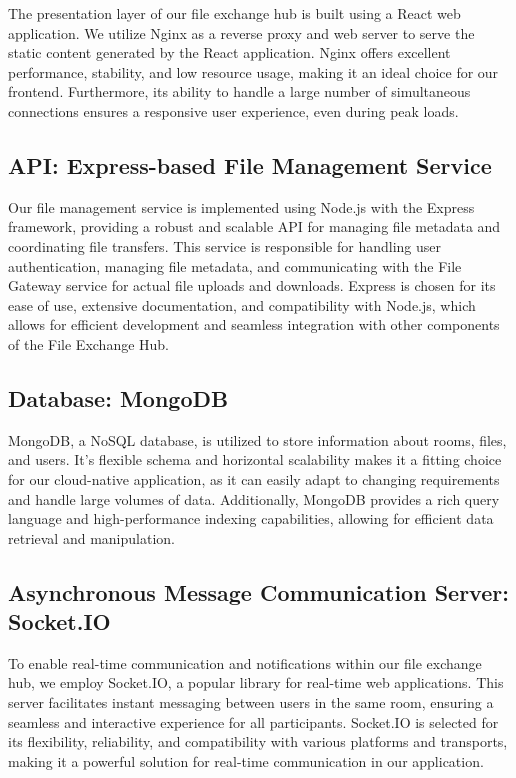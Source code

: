 \documentclass[a4paper,fleqn]{cas-dc}
\begin{document}
The presentation layer of our file exchange hub is built using a React web application. We utilize Nginx as a reverse proxy and web server to serve the static content generated by the React application. Nginx offers excellent performance, stability, and low resource usage, making it an ideal choice for our frontend. Furthermore, its ability to handle a large number of simultaneous connections ensures a responsive user experience, even during peak loads.

\subsection{API: Express-based File Management Service}

Our file management service is implemented using Node.js with the Express framework, providing a robust and scalable API for managing file metadata and coordinating file transfers. This service is responsible for handling user authentication, managing file metadata, and communicating with the File Gateway service for actual file uploads and downloads. Express is chosen for its ease of use, extensive documentation, and compatibility with Node.js, which allows for efficient development and seamless integration with other components of the File Exchange Hub.

\subsection{Database: MongoDB}

MongoDB, a NoSQL database, is utilized to store information about rooms, files, and users. It's flexible schema and horizontal scalability makes it a fitting choice for our cloud-native application, as it can easily adapt to changing requirements and handle large volumes of data. Additionally, MongoDB provides a rich query language and high-performance indexing capabilities, allowing for efficient data retrieval and manipulation.

\subsection{Asynchronous Message Communication Server: Socket.IO}

To enable real-time communication and notifications within our file exchange hub, we employ Socket.IO, a popular library for real-time web applications. This server facilitates instant messaging between users in the same room, ensuring a seamless and interactive experience for all participants. Socket.IO is selected for its flexibility, reliability, and compatibility with various platforms and transports, making it a powerful solution for real-time communication in our application.
\end{document}
